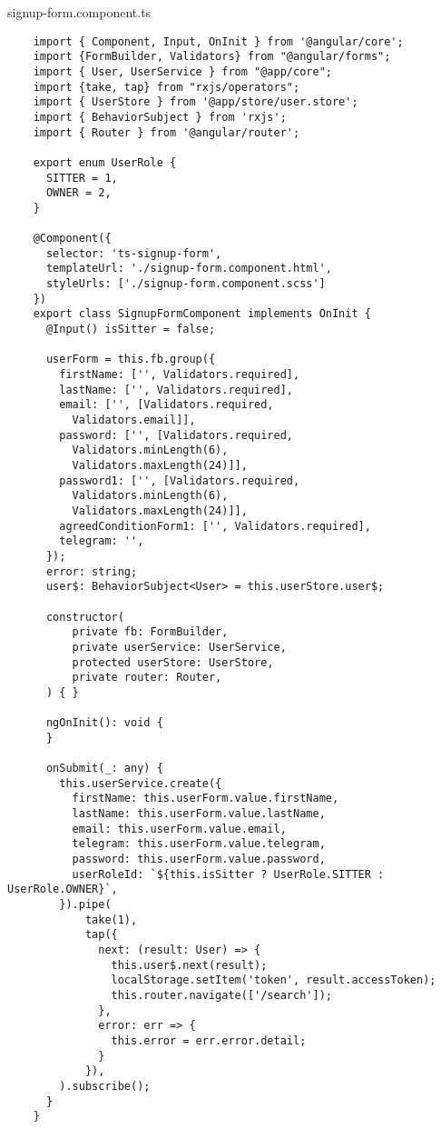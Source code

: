 signup-form.component.ts
\begin{lstlisting}
    import { Component, Input, OnInit } from '@angular/core';
    import {FormBuilder, Validators} from "@angular/forms";
    import { User, UserService } from "@app/core";
    import {take, tap} from "rxjs/operators";
    import { UserStore } from '@app/store/user.store';
    import { BehaviorSubject } from 'rxjs';
    import { Router } from '@angular/router';
    
    export enum UserRole {
      SITTER = 1,
      OWNER = 2,
    }
    
    @Component({
      selector: 'ts-signup-form',
      templateUrl: './signup-form.component.html',
      styleUrls: ['./signup-form.component.scss']
    })
    export class SignupFormComponent implements OnInit {
      @Input() isSitter = false;
    
      userForm = this.fb.group({
        firstName: ['', Validators.required],
        lastName: ['', Validators.required],
        email: ['', [Validators.required,
          Validators.email]],
        password: ['', [Validators.required,
          Validators.minLength(6),
          Validators.maxLength(24)]],
        password1: ['', [Validators.required,
          Validators.minLength(6),
          Validators.maxLength(24)]],
        agreedConditionForm1: ['', Validators.required],
        telegram: '',
      });
      error: string;
      user$: BehaviorSubject<User> = this.userStore.user$;
    
      constructor(
          private fb: FormBuilder,
          private userService: UserService,
          protected userStore: UserStore,
          private router: Router,
      ) { }
    
      ngOnInit(): void {
      }
    
      onSubmit(_: any) {
        this.userService.create({
          firstName: this.userForm.value.firstName,
          lastName: this.userForm.value.lastName,
          email: this.userForm.value.email,
          telegram: this.userForm.value.telegram,
          password: this.userForm.value.password,
          userRoleId: `${this.isSitter ? UserRole.SITTER : UserRole.OWNER}`,
        }).pipe(
            take(1),
            tap({
              next: (result: User) => {
                this.user$.next(result);
                localStorage.setItem('token', result.accessToken);
                this.router.navigate(['/search']);
              },
              error: err => {
                this.error = err.error.detail;
              }
            }),
        ).subscribe();
      }
    }    
\end{lstlisting}

